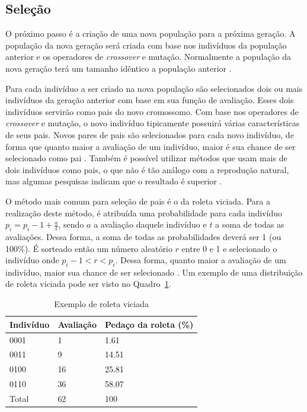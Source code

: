 \documentclass[12pt,oneside,a4paper,english,french,spanish,brazil,]{abntex2}
\begin{document}
\subsection{Seleção}

O próximo passo é a criação de uma nova população para a próxima geração. A população da nova geração será criada com base nos indivíduos da população anterior e os operadores de \textit{crossover} e mutação. Normalmente a população da nova geração terá um tamanho idêntico a população anterior \cite{linden:2008}.

Para cada indivíduo a ser criado na nova população são selecionados dois ou mais indivíduos da geração anterior com base em sua função de avaliação. Esses dois indivíduos servirão como pais do novo cromossomo. Com base nos operadores de \textit{crossover} e mutação, o novo indivíduo tipicamente possuirá várias características de seus pais. Novos pares de pais são selecionados para cada novo indivíduo, de forma que quanto maior a avaliação de um indivíduo, maior é sua chance de ser selecionado como pai \cite{linden:2008}. Também é possível utilizar métodos que usam mais de dois indivíduos como pais, o que não é tão análogo com a reprodução natural, mas algumas pesquisas indicam que o resultado é superior \cite{ting:2005} \cite{eiben:1994}.

O método mais comum para seleção de pais é o da roleta viciada. Para a realização deste método, é atribuída uma probabilidade para cada indivíduo \(p_i = p_i-1 + \frac{a}{t}\), sendo \(a\) a avaliação daquele indivíduo e \(t\) a soma de todas as avaliações. Dessa forma, a soma de todas as probabilidades deverá ser 1 (ou 100\%). É sorteado então um número aleatório \(r\) entre 0 e 1 e selecionado o indivíduo onde \(p_i-1 < r < p_i\). Dessa forma, quanto maior a avaliação de um indivíduo, maior sua chance de ser selecionado \cite{linden:2008}. Um exemplo de uma distribuição de roleta viciada pode ser visto no Quadro~\ref{tab:Roleta}.

\begin{table}[]
\centering
\caption{Exemplo de roleta viciada}
\label{tab:Roleta}
\begin{tabular}{|l|l|l|}
\hline
Indivíduo & Avaliação & Pedaço da roleta (\%) \\ \hline
0001      & 1         & 1.61                  \\ \hline
0011      & 9         & 14.51                 \\ \hline
0100      & 16        & 25.81                 \\ \hline
0110      & 36        & 58.07                 \\ \hline
Total     & 62        & 100                   \\ \hline
\end{tabular}
\end{table}
\end{document}
